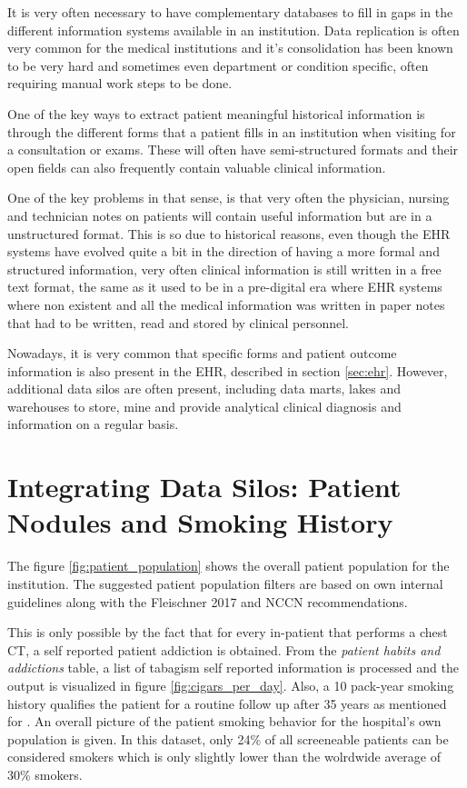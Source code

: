 It is very often necessary to have complementary databases to fill in gaps in the different information systems available in an institution. Data replication is often very common for the medical institutions and it's consolidation has been known to be very hard and sometimes even department or condition specific, often requiring manual work steps to be done.

One of the key ways to extract patient meaningful historical information is through the different forms that a patient fills in an institution when visiting for a consultation or exams. These will often have semi-structured formats and their open fields can also frequently contain valuable clinical information. 

One of the key problems in that sense, is that very often the physician, nursing and technician notes on patients will contain useful information but are in a unstructured format. This is so due to historical reasons, even though the EHR systems have evolved quite a bit in the direction of having a more formal and structured information, very often clinical information is still written in a free text format, the same as it used to be in a pre-digital era where EHR systems where non existent and all the medical information was written in paper notes that had to be written, read and stored by clinical personnel.

Nowadays, it is very common that specific forms and patient outcome information is also present in the EHR, described in section \ref{sec:ehr}. However, additional data silos are often present, including data marts, lakes and warehouses to store, mine and provide analytical clinical diagnosis and information on a regular basis.

\section{Integrating Data Silos: Patient Nodules and Smoking History}

The figure \ref{fig:patient_population} shows the overall patient population for the institution. The suggested patient population filters are based on \nomeHslShort{} own internal guidelines along with the Fleischner 2017 and NCCN recommendations.

This is only possible by the fact that for every in-patient that performs a chest CT, a self reported patient addiction is obtained. From the \emph{patient habits and addictions} table, a list of tabagism self reported information is processed and the output is visualized in figure \ref{fig:cigars_per_day}.
Also, a 10 pack-year smoking history qualifies the patient for a routine follow up after 35 years as mentioned for \nomeHslShort{}. An overall picture of the patient smoking behavior for the hospital's own population is given. In this dataset, only 24\% of all screeneable patients can be considered smokers which is only slightly lower than the wolrdwide average of 30\% smokers.

